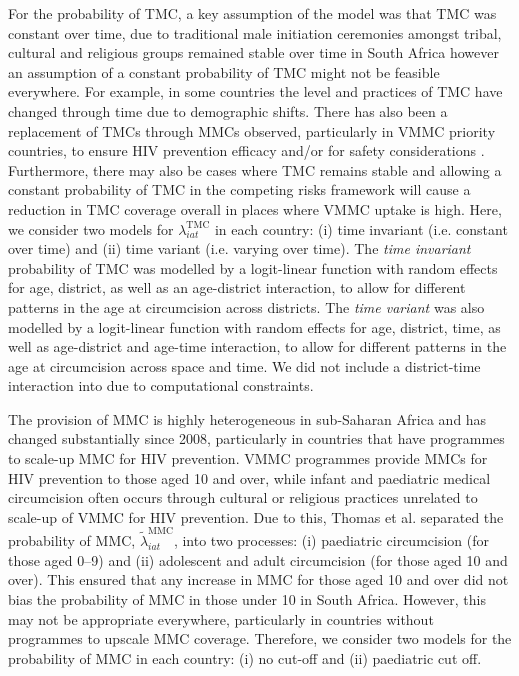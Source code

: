 \documentclass{article}
\begin{document}
For the probability of TMC, a key assumption of the \cite{thomas2021multilevel} model was that TMC was constant over time, due to traditional male initiation ceremonies amongst tribal, cultural and religious groups remained stable over time in South Africa however an assumption of a constant probability of TMC might not be feasible everywhere. For example, in some countries the level and practices of TMC have changed through time due to demographic shifts. There has also been a replacement of TMCs through MMCs observed, particularly in VMMC priority countries, to ensure HIV prevention efficacy and/or for safety considerations \cite{thomas2021multilevel}. Furthermore, there may also be cases where TMC remains stable and allowing a constant probability of TMC in the competing risks framework will cause a reduction in TMC coverage overall in places where VMMC uptake is high. Here, we consider two models for $\lambda^{\text{TMC}}_{iat}$ in each country: (i) time invariant (i.e. constant over time) and (ii) time variant (i.e. varying over time). The {\it time invariant} probability of TMC was modelled by a logit-linear function with random effects for age, district, as well as an age-district interaction, to allow for different patterns in the age at circumcision across districts. The {\it time variant} was also modelled by a logit-linear function with random effects for age, district, time, as well as age-district and age-time interaction, to allow for different patterns in the age at circumcision across space and time. We did not include a district-time interaction into due to computational constraints. 

The provision of MMC is highly heterogeneous in sub-Saharan Africa and has changed substantially since 2008, particularly in countries that have programmes to scale-up MMC for HIV prevention. VMMC programmes provide MMCs for HIV prevention to those aged 10 and over, while infant and paediatric medical circumcision often occurs through cultural or religious practices unrelated to scale-up of VMMC for HIV prevention. Due to this, Thomas et al. \cite{thomas2021multilevel} separated the probability of MMC, $\tilde{\lambda}^{\text{MMC}}_{iat}$, into two processes: (i) paediatric circumcision (for those aged 0--9) and (ii) adolescent and adult circumcision (for those aged 10 and over). This ensured that any increase in MMC for those aged 10 and over did not bias the probability of MMC in those under 10 in South Africa. However, this may not be appropriate everywhere, particularly in countries without programmes to upscale MMC coverage. Therefore, we consider two models for the probability of MMC in each country: (i) no cut-off and (ii) paediatric cut off.
\end{document}
